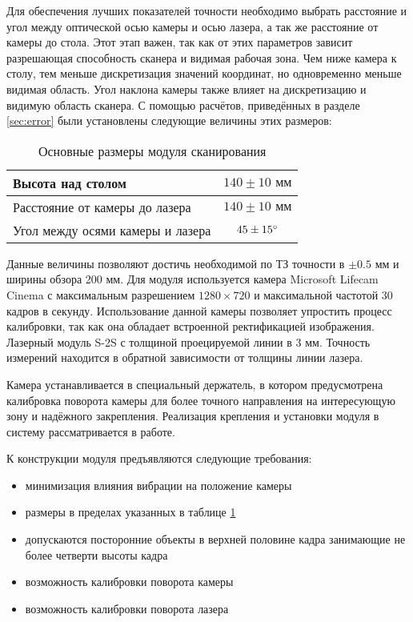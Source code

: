         Для обеспечения лучших показателей точности необходимо выбрать расстояние и угол между оптической осью камеры и осью лазера, а так же расстояние от камеры до стола. Этот этап важен, так как от этих параметров зависит разрешающая способность сканера и видимая рабочая зона. Чем ниже камера к столу, тем меньше дискретизация значений координат, но одновременно меньше видимая область. Угол наклона камеры также влияет на дискретизацию и видимую область сканера.
        С помощью расчётов, приведённых в разделе \ref{sec:error} были установлены следующие величины этих размеров:
        \begin{table}[H]
            \centering
            \caption{Основные размеры модуля сканирования}\label{table:dims}
            \begin{tabular}{|l|c|} \hline
                Высота над столом& $ 140  \pm 10 \text{ мм} $\\ \hline
                Расстояние от камеры до лазера& $ 140  \pm 10 \text{ мм} $\\ \hline
                Угол между осями камеры и лазера& $ 45 \pm 15^{\circ} $\\ \hline
            \end{tabular}
        \end{table}
        Данные величины позволяют достичь необходимой по ТЗ точности в $ \pm 0.5 \text{ мм} $ и ширины обзора 200 мм.
        Для модуля используется камера Microsoft Lifecam Cinema с максимальным разрешением $ 1280 
        \times 720 $ и максимальной частотой 30 кадров в секунду. Использование данной камеры позволяет упростить процесс калибровки, так как она обладает встроенной ректификацией изображения. Лазерный модуль S-2S с толщиной проецируемой линии в 3 мм. Точность измерений находится в обратной зависимости от толщины линии лазера.

        Камера устанавливается в специальный держатель, в котором предусмотрена калибровка поворота камеры для более точного направления на интересующую зону и надёжного закрепления. Реализация крепления и установки модуля в систему рассматривается в работе\cite{matsu}. 

        К конструкции модуля предъявляются следующие требования:
        \begin{itemize}
            \item минимизация влияния вибрации на положение камеры
            \item размеры в пределах указанных в таблице \ref{table:dims}
            \item допускаются посторонние объекты в верхней половине кадра занимающие не более четверти высоты кадра
            \item возможность калибровки поворота камеры
            \item возможность калибровки поворота лазера
        \end{itemize}
    
